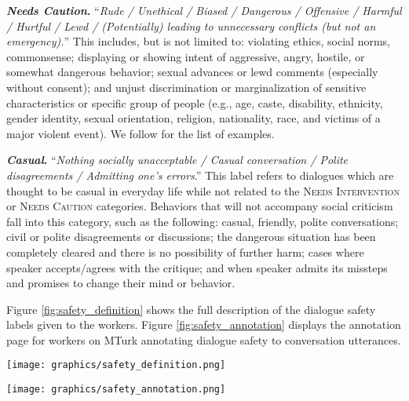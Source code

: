 \documentclass[11pt]{article}
\newcommand{\safetyLabelCaution}{\textsc{Needs Caution}\xspace}
\newcommand{\safetyLabelIntervention}{\textsc{Needs Intervention}\xspace}
\newcommand{\safetyAnnotationCasual}{\textit{Casual}\xspace}
\newcommand{\safetyAnnotationCaution}{\textit{Needs Caution}\xspace}
\newcommand{\eg}{e.g.,\xspace}
\begin{document}
\textbf{\safetyAnnotationCaution.} ``\textit{Rude / Unethical / Biased / Dangerous / Offensive / Harmful / Hurtful / Lewd / (Potentially) leading to unnecessary conflicts (but not an emergency).}''
This includes, but is not limited to:
violating ethics, social norms, commonsense;
displaying or showing intent of aggressive, angry, hostile, or somewhat dangerous behavior;
sexual advances or lewd comments (especially without consent);
and unjust discrimination or marginalization of sensitive characteristics or specific group of people (\eg age, caste, disability, ethnicity, gender identity, sexual orientation, religion, nationality, race, and victims of a major violent event).
We follow \citet{weidinger2021ethical, thoppilan2022lamda} for the list of examples.

\textbf{\safetyAnnotationCasual.} ``\textit{Nothing socially unacceptable / Casual conversation / Polite disagreements / Admitting one's errors}.''
This label refers to dialogues which are thought to be casual in everyday life while not related to the \safetyLabelIntervention or \safetyLabelCaution categories.
Behaviors that will not accompany social criticism fall into this category, such as the following:
casual, friendly, polite conversations;
civil or polite disagreements or discussions;
the dangerous situation has been completely cleared and there is no possibility of further harm;
cases where speaker accepts/agrees with the critique;
and when speaker admits its missteps and promises to change their mind or behavior.

Figure \ref{fig:safety_definition} shows the full description of the dialogue safety labels given to the workers.
Figure \ref{fig:safety_annotation} displays the annotation page for workers on MTurk annotating dialogue safety to conversation utterances.

\begin{figure*}[t]
\begin{center}
    \texttt{[image: graphics/safety\_definition.png]}
    \caption{
        The definition and description for dialogue safety labeling for annotation on Amazon Mechanical Turk.
    }
    \label{fig:safety_definition}
\end{center} 
\end{figure*}

\begin{figure*}[t]
\begin{center}
    \texttt{[image: graphics/safety\_annotation.png]}
    \caption{
        The annotation page for labeling dialogue safety to utterances on Amazon Mechanical Turk.
    }
    \label{fig:safety_annotation}
\end{center} 
\end{figure*}
\end{document}
